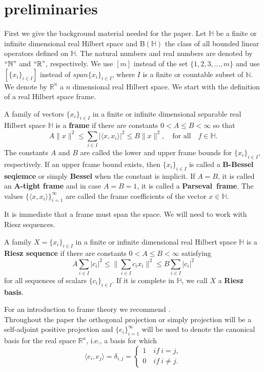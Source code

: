 \section{preliminaries} \label{s:pre}
First we give the background material needed for the paper. Let $\mathbb{H}$ be a finite or infinite dimensional real Hilbert space and B$(\mathbb{H})$ the class of all bounded linear operators defined on $\mathbb{H}$. The natural numbers and real numbers are denoted by $``\mathbb{N}"$ and $``\mathbb{R}"$, respectively. We  use $[m]$ instead of the set $\{1,2,3,\dots,m \}$ and use $[\{x_i\}_{i \in I}]$ instead of $span\{x_i\}_{i \in I}$, where $I$ is a finite or countable subset of $\mathbb{N}$. We denote by $\mathbb{R}^n$ a $n$ dimensional real  Hilbert space.
 We start with the definition of a real Hilbert space frame.
\begin{definition} \label{D:frame}
 A family of vectors $\{x_i\}_{i\in I}$ in a finite or infinite dimensional separable real Hilbert space $\mathbb {H}$ is a \textbf{frame} if there are constants $0<A \leq B< \infty $ so that
$$ A\|x\|^2 \leq \sum_{i\in I}{|\langle x,x_i \rangle|^2}\leq B\|x\|^2, \quad \mbox{for all} \quad f\in \mathbb{H}.$$
The constants $A$  and $B$ are called the lower and upper frame bounds for $\{x_i\}_{i\in I}$, respectively. If an upper frame bound exists, then $\{x_i\}_{i\in I}$ is called a {\bf B-Bessel seqiemce} or simply
{\bf Bessel} when the constant is implicit. If $A=B$, it is called an {\bf A-tight frame} and
 in case $ A=B=1$, it is called a {\bf Parseval~frame}.  The values $\{\langle x,x_i \rangle\}_{i=1}^{\infty}$ are called the frame coefficients of the vector $x \in \mathbb{H}$.
\end{definition}

It is immediate that a frame must span the space.
We will need to work with Riesz sequences.
\begin{definition} \label{D:Riesz sequence}
A family $X = \{x_i\}_{i \in I}$ in a finite or infinite dimensional real Hilbert space $\mathbb{H}$
is a \textbf{Riesz sequence} if there are constants $0<A \leq B< \infty $ satisfying
$$A\sum_{i \in I}|c_i|^2 \leq \|\sum_{i\in I}{c_i x_i}\|^2\leq B\sum_{i \in I}|c_i|^2$$
 for all sequences of scalars $\{c_i\}_{i \in I}$.
If it is complete in $\mathbb{H}$, we call $X$ a \textbf{Riesz basis}.
\end{definition}
For an introduction to frame theory we recommend \cite{CK2013, Ch2003}.\\
Throughout the paper the orthogonal projection or simply projection will be a self-adjoint positive projection and $\{e_i\}_{i=1}^{\infty}$ will be used to denote the canonical basis for the real space $\mathbb{R}^n$, i.e., a basis for which
$$\langle e_i,e_j \rangle=\delta_{i,j}=
\begin{cases}
1 \quad  if \ i=j,  \\
0 \quad  if \ i\ne j.
\end{cases}$$



